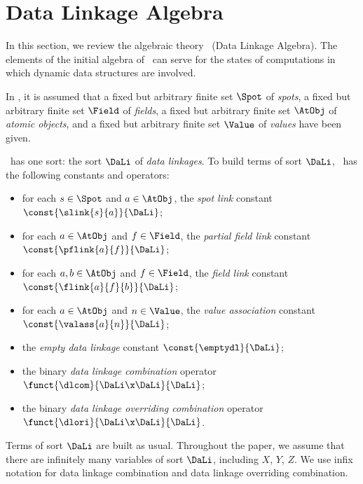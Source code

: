 \documentclass[fleqn]{llncs}
\begin{document}
\section{Data Linkage Algebra}
\label{sect-DLA}

In this section, we review the algebraic theory \DLA\ (Data Linkage
Algebra).
The elements of the initial algebra of \DLA\ can serve for the states of
computations in which dynamic data structures are involved.

In \DLA, it is assumed that a fixed but arbitrary finite set $\Spot$ of
\emph{spots}, a fixed but arbitrary finite set $\Field$ of
\emph{fields}, a fixed but arbitrary finite set $\AtObj$ of \emph{atomic
objects}, and a fixed but arbitrary finite set $\Value$ of \emph{values}
have been given.

\DLA\ has one sort: the sort $\DaLi$ of \emph{data linkages}.
To build terms of sort $\DaLi$, \BTA\ has the following constants and
operators:
\begin{itemize}
\item
for each $s \in \Spot$ and $a \in \AtObj$,
the \emph{spot link} constant $\const{\slink{s}{a}}{\DaLi}$;
\item
for each $a \in \AtObj$ and $f \in \Field$,
the \emph{partial field link} constant $\const{\pflink{a}{f}}{\DaLi}$;
\item
for each $a,b \in \AtObj$ and $f \in \Field$,
the \emph{field link} constant $\const{\flink{a}{f}{b}}{\DaLi}$;
\item
for each $a \in \AtObj$ and $n \in \Value$,
the \emph{value association} constant $\const{\valass{a}{n}}{\DaLi}$;
\item
the \emph{empty data linkage} constant $\const{\emptydl}{\DaLi}$;
\item
the binary \emph{data linkage combination} operator
$\funct{\dlcom}{\DaLi \x \DaLi}{\DaLi}$;
\item
the binary \emph{data linkage overriding combination} operator
$\funct{\dlori}{\DaLi \x \DaLi}{\DaLi}$.
\end{itemize}
Terms of sort $\DaLi$ are built as usual.
Throughout the paper, we assume that there are infinitely many variables
of sort $\DaLi$, including $X$, $Y$, $Z$.
We use infix notation for data linkage combination and data linkage
overriding combination.
\end{document}
